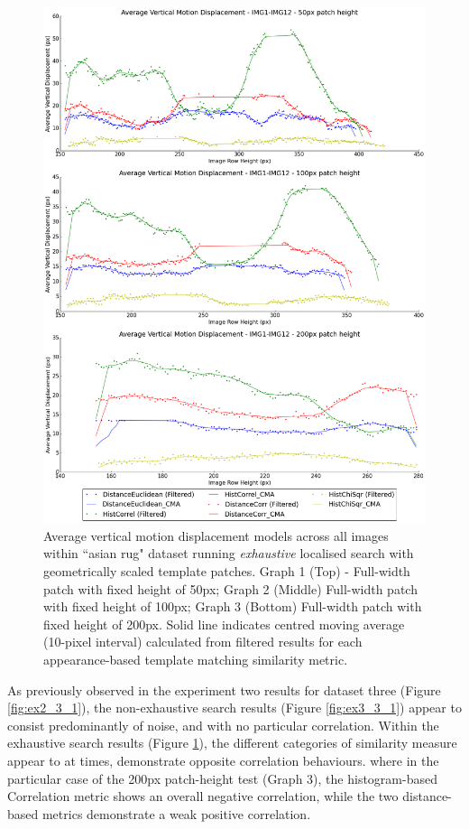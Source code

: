 \clearpage
\begin{figure}[ht!]
\centering
\includegraphics[scale=0.3]{images/results/wiltshire_inside_10cm_scaled_exhaustive}
\caption{Average vertical motion displacement models across all images within ``asian rug" dataset running \textit{exhaustive} localised search with geometrically scaled template patches. Graph 1 (Top) - Full-width patch with fixed height of 50px; Graph 2 (Middle) Full-width patch with fixed height of 100px; Graph 3 (Bottom) Full-width patch with fixed height of 200px. Solid line indicates centred moving average (10-pixel interval) calculated from filtered results for each appearance-based template matching similarity metric.}
\label{fig:ex3_3_2}
\end{figure}

As previously observed in the experiment two results for dataset three (Figure \ref{fig:ex2_3_1}), the non-exhaustive search results (Figure \ref{fig:ex3_3_1}) appear to consist predominantly of noise, and with no particular correlation. Within the exhaustive search results (Figure \ref{fig:ex3_3_2}), the different categories of similarity measure appear to at times, demonstrate opposite correlation behaviours. where in the particular case of the 200px patch-height test (Graph 3), the histogram-based Correlation metric shows an overall negative correlation, while the two distance-based metrics demonstrate a weak positive correlation.

